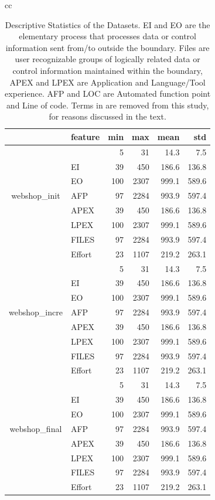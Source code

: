 \begin{table}[t!]
{\begin{tabular}{cc}
~

\scriptsize
\begin{tabular}{|c|l|rrrr|}
    \hline
      & feature
    & min  & max & mean & std\\
   \hline
\multirow{7}{*}{\begin{sideways}webshop\_init\end{sideways}}
& \IT{LOC} & 5 & 31 & 14.3 & 7.5\\
& EI & 39 & 450 & 186.6 & 136.8\\
& EO & 100 & 2307 & 999.1 & 589.6\\
& AFP & 97 & 2284 & 993.9 & 597.4\\
& APEX & 39 & 450 & 186.6 & 136.8\\
& LPEX & 100 & 2307 & 999.1 & 589.6\\
& FILES & 97 & 2284 & 993.9 & 597.4\\
& Effort & 23 & 1107 & 219.2 & 263.1\\
\hline
\multirow{7}{*}{\begin{sideways}webshop\_incre\end{sideways}}
& \IT{LOC} & 5 & 31 & 14.3 & 7.5\\
& EI & 39 & 450 & 186.6 & 136.8\\
& EO & 100 & 2307 & 999.1 & 589.6\\
& AFP & 97 & 2284 & 993.9 & 597.4\\
& APEX & 39 & 450 & 186.6 & 136.8\\
& LPEX & 100 & 2307 & 999.1 & 589.6\\
& FILES & 97 & 2284 & 993.9 & 597.4\\
& Effort & 23 & 1107 & 219.2 & 263.1\\
\hline
\multirow{7}{*}{\begin{sideways}webshop\_final\end{sideways}}
& \IT{LOC} & 5 & 31 & 14.3 & 7.5\\
& EI & 39 & 450 & 186.6 & 136.8\\
& EO & 100 & 2307 & 999.1 & 589.6\\
& AFP & 97 & 2284 & 993.9 & 597.4\\
& APEX & 39 & 450 & 186.6 & 136.8\\
& LPEX & 100 & 2307 & 999.1 & 589.6\\
& FILES & 97 & 2284 & 993.9 & 597.4\\
& Effort & 23 & 1107 & 219.2 & 263.1\\
\hline
\end{tabular} 

\end{tabular}
}
\caption{Descriptive Statistics of the Datasets. EI and EO are the elementary process that processes data or control information sent from/to outside the boundary. Files are user recognizable groups of logically related data or control information maintained within the boundary, APEX and LPEX are Application and Language/Tool experience. AFP and LOC are Automated function point and Line of code. Terms in  are removed from this study, for reasons discussed in the text.}\label{table:dataset}
\end{table}


